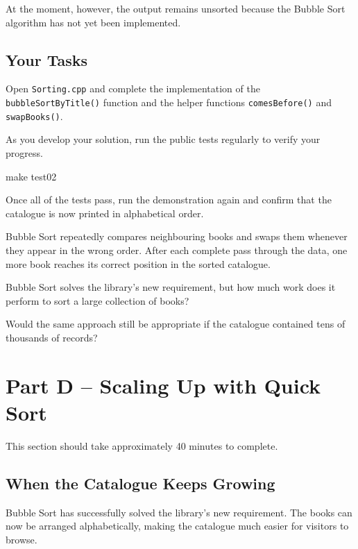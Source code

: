 \documentclass{csc2059practical}
\begin{document}
At the moment, however, the output remains unsorted because the Bubble Sort algorithm has not yet been implemented.

\subsection{Your Tasks}

Open \texttt{Sorting.cpp} and complete the implementation of the \texttt{bubbleSortByTitle()} function and the helper functions \texttt{comesBefore()} and \texttt{swapBooks()}.

As you develop your solution, run the public tests regularly to verify your progress.

\begin{terminal}
make test02
\end{terminal}

Once all of the tests pass, run the demonstration again and confirm that the catalogue is now printed in alphabetical order.

\begin{tipbox}
Bubble Sort repeatedly compares neighbouring books and swaps them whenever they appear in the wrong order. After each complete pass through the data, one more book reaches its correct position in the sorted catalogue.
\end{tipbox}

\begin{reflectionbox}
Bubble Sort solves the library's new requirement, but how much work does it perform to sort a large collection of books?

Would the same approach still be appropriate if the catalogue contained tens of thousands of records?
\end{reflectionbox}

\section{Part D -- Scaling Up with Quick Sort}
\begin{infobox}
    This section should take approximately 40 minutes to complete.
\end{infobox}

\subsection{When the Catalogue Keeps Growing}

Bubble Sort has successfully solved the library's new requirement. The books can now be arranged alphabetically, making the catalogue much easier for visitors to browse.
\end{document}
